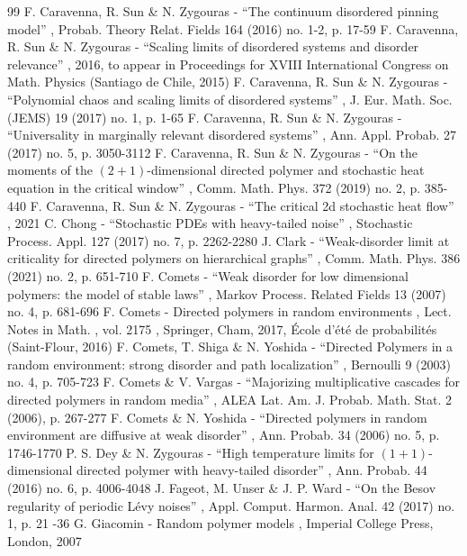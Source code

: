 \documentclass[11pt]{article}
\numberwithin{equation}{section}
\theoremstyle{definition}
\begin{document}
\begin{thebibliography}{99}
 F. Caravenna, R. Sun \& N. Zygouras - “The continuum disordered pinning model” , Probab. Theory Relat. Fields 164 (2016) no. 1-2, p. 17-59
 F. Caravenna, R. Sun \& N. Zygouras - “Scaling limits of disordered systems and disorder relevance” , 2016, to appear in Proceedings for XVIII International Congress on Math. Physics (Santiago de Chile, 2015)
 F. Caravenna, R. Sun \& N. Zygouras - “Polynomial chaos and scaling limits of disordered systems” , J. Eur. Math. Soc. (JEMS) 19 (2017) no. 1, p. 1-65
 F. Caravenna, R. Sun \& N. Zygouras - “Universality in marginally relevant disordered systems” , Ann. Appl. Probab. 27 (2017) no. 5, p. 3050-3112
 F. Caravenna, R. Sun \& N. Zygouras - “On the moments of the $(2+1)$-dimensional directed polymer and stochastic heat equation in the critical window” , Comm. Math. Phys. 372 (2019) no. 2, p. 385-440
 F. Caravenna, R. Sun \& N. Zygouras - “The critical 2d stochastic heat flow” , 2021
 C. Chong - “Stochastic PDEs with heavy-tailed noise” , Stochastic Process. Appl. 127 (2017) no. 7, p. 2262-2280
 J. Clark - “Weak-disorder limit at criticality for directed polymers on hierarchical graphs” , Comm. Math. Phys. 386 (2021) no. 2, p. 651-710
 F. Comets - “Weak disorder for low dimensional polymers: the model of stable laws” , Markov Process. Related Fields 13 (2007) no. 4, p. 681-696
 F. Comets - Directed polymers in random environments , Lect. Notes in Math. , vol. 2175 , Springer, Cham, 2017, École d’été de probabilités (Saint-Flour, 2016)
 F. Comets, T. Shiga \& N. Yoshida - “Directed Polymers in a random environment: strong disorder and path localization” , Bernoulli 9 (2003) no. 4, p. 705-723
 F. Comets \& V. Vargas - “Majorizing multiplicative cascades for directed polymers in random media” , ALEA Lat. Am. J. Probab. Math. Stat. 2 (2006), p. 267-277
 F. Comets \& N. Yoshida - “Directed polymers in random environment are diffusive at weak disorder” , Ann. Probab. 34 (2006) no. 5, p. 1746-1770
 P. S. Dey \& N. Zygouras - “High temperature limits for $(1+ 1)$-dimensional directed polymer with heavy-tailed disorder” , Ann. Probab. 44 (2016) no. 6, p. 4006-4048
 J. Fageot, M. Unser \& J. P. Ward - “On the Besov regularity of periodic Lévy noises” , Appl. Comput. Harmon. Anal. 42 (2017) no. 1, p. 21 -36
 G. Giacomin - Random polymer models , Imperial College Press, London, 2007

\end{thebibliography}
\end{document}
